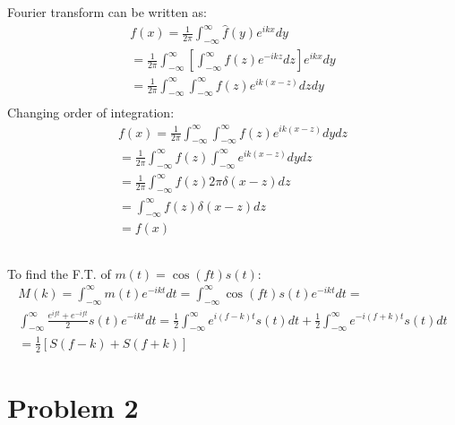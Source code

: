 \documentclass[12pt]{article}
\begin{document}
\subsection{}
Fourier transform can be written as:
\begin{equation}
    \begin{gathered}
        f(x) = \frac{1}{2\pi}\int_{-\infty}^{\infty}\hat{f}(y)e^{ikx}dy\\
        = \frac{1}{2\pi}\int_{-\infty}^{\infty}\left[\int_{-\infty}^{\infty}f(z)e^{-ikz}dz\right]e^{ikx}dy\\        
        = \frac{1}{2\pi}\int_{-\infty}^{\infty}\int_{-\infty}^{\infty}f(z)e^{ik(x-z)}dzdy\\
    \end{gathered}
\end{equation}
Changing order of integration:
\begin{equation}
    \begin{gathered}
        f(x) = \frac{1}{2\pi}\int_{-\infty}^{\infty}\int_{-\infty}^{\infty}f(z)e^{ik(x-z)}dydz\\
        = \frac{1}{2\pi}\int_{-\infty}^{\infty}f(z)\int_{-\infty}^{\infty}e^{ik(x-z)}dydz\\
        = \frac{1}{2\pi}\int_{-\infty}^{\infty}f(z)2\pi\delta(x-z)dz\\
        = \int_{-\infty}^{\infty}f(z)\delta(x-z)dz\\
        = f(x)
    \end{gathered}
\end{equation}
\subsection{}
To find the F.T. of $m(t) = \cos(ft)s(t)$:
\begin{equation}
    \begin{gathered}
        M(k) = \int_{-\infty}^{\infty}m(t)e^{-ikt}dt = \int_{-\infty}^{\infty}\cos(ft)s(t)e^{-ikt}dt = \\
        \int_{-\infty}^{\infty}\frac{e^{ift} + e^{-ift}}{2}s(t)e^{-ikt}dt = \frac{1}{2}\int_{-\infty}^{\infty}e^{i(f-k)t}s(t)dt + \frac{1}{2}\int_{-\infty}^{\infty}e^{-i(f+k)t}s(t)dt\\
        = \frac{1}{2}\left[S(f-k)+S(f+k)\right]
    \end{gathered}
\end{equation}
\section{Problem 2}
\end{document}
